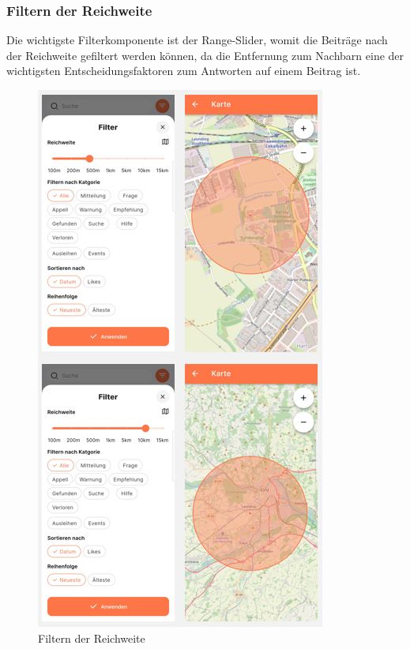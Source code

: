 \subsubsection{Filtern der Reichweite}

Die wichtigste Filterkomponente ist der Range-Slider, womit die Beiträge nach der Reichweite gefiltert werden können, da die Entfernung zum Nachbarn eine der wichtigsten Entscheidungsfaktoren zum Antworten auf einem Beitrag ist.

\begin{figure}[h]
  \centering
  \includegraphics[width=\textwidth]{pics/range-filter.JPG}
  \caption{Filtern der Reichweite}
\end{figure}


